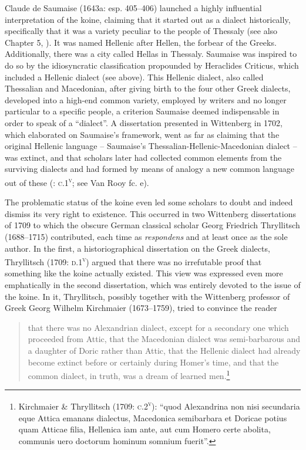 \documentclass[output=paper]{langsci/langscibook}
\begin{document}
Claude de Saumaise (1643a: esp. 405–406) launched a highly influential interpretation of the koine, claiming that it started out as a dialect historically, specifically that it was a variety peculiar to the people of Thessaly (see also Chapter 5, ). It was named Hellenic after Hellen, the forbear of the Greeks. Additionally, there was a city called Hellas in Thessaly. Saumaise was inspired to do so by the idiosyncratic classification propounded by Heraclides Criticus, which included a Hellenic dialect (see  above). This Hellenic dialect, also called Thessalian and Macedonian, after giving birth to the four other Greek dialects, developed into a high-end common variety, employed by writers and no longer particular to a specific people, a criterion Saumaise deemed indispensable in order to speak of a “dialect”. A dissertation presented in Wittenberg in 1702, which elaborated on Saumaise’s framework, went as far as claiming that the original Hellenic language – Saumaise’s Thessalian-Hellenic-Macedonian dialect – was extinct, and that scholars later had collected common elements from the surviving dialects and had formed by means of analogy a new common language out of these (\citealt{SchwartzHelm1702}: \textsc{c}.1\textsc{\textsuperscript{v}}; see Van Rooy fc. e).

The problematic status of the koine even led some scholars to doubt and indeed dismiss its very right to existence. This occurred in two Wittenberg dissertations of 1709 to which the obscure German classical scholar Georg Friedrich Thryllitsch (1688–1715) contributed, each time as \textit{respondens} and at least once as the sole author. In the first, a historiographical dissertation on the Greek dialects, Thryllitsch (1709: \textsc{d.1}\textsc{\textsuperscript{v}}) argued that there was no irrefutable proof that something like the koine actually existed. This view was expressed even more emphatically in the second dissertation, which was entirely devoted to the issue of the koine. In it, Thryllitsch, possibly together with the Wittenberg professor of Greek Georg Wilhelm Kirchmaier (1673–1759), tried to convince the reader

\begin{quote}
that there was no Alexandrian dialect, except for a secondary one which proceeded from Attic, that the Macedonian dialect was semi-barbarous and a daughter of Doric rather than Attic, that the Hellenic dialect had already become extinct before or certainly during Homer’s time, and that the common dialect, in truth, was a dream of learned men.\footnote{Kirchmaier \& Thryllitsch (1709: \textsc{c.2}\textsc{\textsuperscript{v}}): “quod Alexandrina non nisi secundaria eque Attica emanans dialectus, Macedonica semibarbara et Doricae potius quam Atticae filia, Hellenica iam ante, aut cum Homero certe abolita, communis uero doctorum hominum somnium fuerit”.}
\end{quote}
\end{document}
